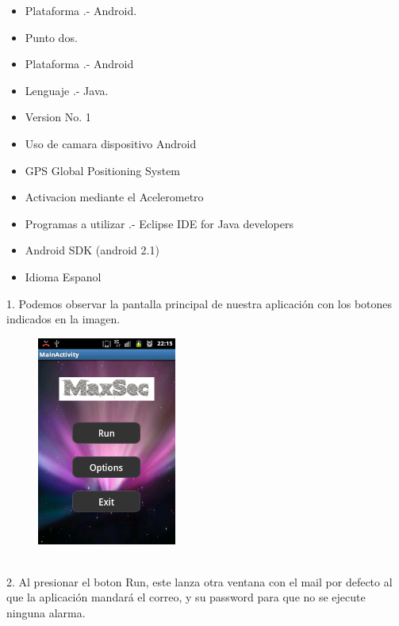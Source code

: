 \documentclass[12pt,letterpaper]{article}
\begin{document}
   \begin{itemize}
   
   \item Plataforma .- Android.
   \item Punto dos.
   \item Plataforma .- Android
   \item Lenguaje .- Java.
   \item Version No. 1
   \item Uso de camara dispositivo Android
   \item GPS Global Positioning System
   \item Activacion mediante el Acelerometro
   \item Programas a utilizar .- Eclipse IDE for Java developers
   \item Android SDK (android 2.1)
   \item Idioma{\tiny } Espanol
   
   
   \end{itemize}
1. Podemos observar la pantalla principal de nuestra aplicación con los botones indicados en la imagen.
\begin{figure}[h]
\begin{center}
\includegraphics[width=130pt]{max1.png}\\
\end{center}
\end{figure}\\
2. Al presionar el boton Run, este lanza otra ventana con el mail por defecto al que la  aplicación mandará el correo, y su password  para que no se ejecute ninguna alarma.
\end{document}
